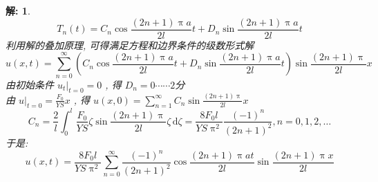 \documentclass{article}
\theoremstyle{nonumberplain}
\newtheorem{solution}{\textcolor{gr}{解:}}
\newcommand{\dd}{\,\mathrm{d}}
\begin{document}
\begin{solution}
\begin{equation*}
    		T_{n}(t)=C_{n}\cos\frac{(2n+1)\uppi a}{2l}t+D_{n}\sin\frac{(2n+1)\uppi a}{2l}t\tag*{$\cdots\cdots2$分}
    	\end{equation*}
    	利用解的叠加原理, 可得满足方程和边界条件的级数形式解
    	\begin{equation*}
    		u(x,t)=\sum_{n=0}^{\infty}\left( C_{n}\cos\frac{(2n+1)\uppi a}{2l}t+D_{n}\sin\frac{(2n+1)\uppi a}{2l}t \right)\sin\frac{(2n+1)\uppi}{2l}x\tag*{$\cdots\cdots1$分}
    	\end{equation*}
    	由初始条件 $u_{t}|_{t=0}=0$ , 得 $D_{n}=0$\hfill$\cdots\cdots2$分\\
    	由 $u|_{t=0}=\frac{F_{0}}{YS}x$ , 得 $u(x,0)=\sum_{n=1}^{\infty}C_{n}\sin\frac{(2n+1)\uppi}{2l}x$
    	\begin{equation*}
    		C_{n}=\frac{2}{l}\int_{0}^{l}\frac{F_{0}}{YS}\zeta\sin\frac{(2n+1)\uppi}{2l}\zeta\dd\zeta=\frac{8F_{0}l}{YS\uppi^2}\frac{(-1)^n}{(2n+1)^2},n=0,1,2,\ldots\tag*{$\cdots\cdots2$分}
    	\end{equation*}
    	于是:
    	\begin{equation*}
    		u(x,t)=\frac{8F_{0}l}{YS\uppi^2}\sum_{n=0}^{\infty}\frac{(-1)^n}{(2n+1)^2}\cos\frac{(2n+1)\uppi at}{2l}\sin\frac{(2n+1)\uppi x}{2l}\tag*{$\cdots\cdots3$分}
    	\end{equation*}
    \end{solution}
    
\end{document}
